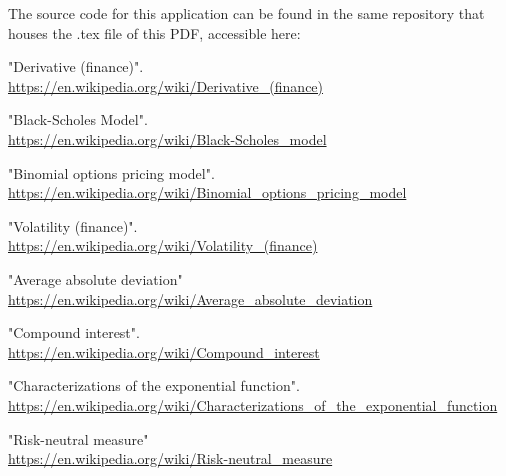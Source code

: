 \documentclass[12pt, letterpaper]{article}\usepackage{float}
\begin{document}
The source code for this application can be found in the same repository that houses the .tex file of this PDF, accessible here:

\href{https://github.com/cliuj/binomial-options-pricing-model}{\color{blue}{https://github.com/cliuj/binomial-options-pricing-model}}

\pagebreak
\begin{thebibliography}{9}
    "Derivative (finance)".
    \\
    \href{https://en.wikipedia.org/wiki/Derivative\_(finance)}{https://en.wikipedia.org/wiki/Derivative\_(finance)}

    "Black-Scholes Model".
    \\
    \href{https://en.wikipedia.org/wiki/Black-Scholes\_model}{https://en.wikipedia.org/wiki/Black-Scholes\_model}

    "Binomial options pricing model".
    \\
    \href{https://en.wikipedia.org/wiki/Binomial\_options\_pricing\_model}{https://en.wikipedia.org/wiki/Binomial\_options\_pricing\_model}

    "Volatility (finance)".
    \\
    \href{https://en.wikipedia.org/wiki/Volatility\_(finance)}{https://en.wikipedia.org/wiki/Volatility\_(finance)}

    "Average absolute deviation"
    \\
    \href{https://en.wikipedia.org/wiki/Average\_absolute\_deviation}{https://en.wikipedia.org/wiki/Average\_absolute\_deviation}

    "Compound interest". \\
    \href{https://en.wikipedia.org/wiki/Compound\_interest}{https://en.wikipedia.org/wiki/Compound\_interest}

    "Characterizations of the exponential function". \\
    \href{https://en.wikipedia.org/wiki/Characterizations\_of\_the\_exponential\_function}{https://en.wikipedia.org/wiki/Characterizations\_of\_the\_exponential\_function}

    "Risk-neutral measure" \\
    \href{https://en.wikipedia.org/wiki/Risk-neutral\_measure}{https://en.wikipedia.org/wiki/Risk-neutral\_measure}


\end{thebibliography}
\end{document}

